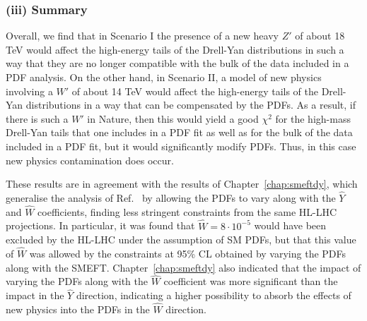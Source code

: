 \documentclass[withindex,glossary]{cam-thesis}
\begin{document}
\subsubsection*{(iii) Summary}
Overall, we find that in Scenario I the presence of a new
heavy $Z'$ of about 18 TeV would affect the high-energy tails of the Drell-Yan
  distributions in such a way that they are no longer compatible with the
  bulk of the data included in a PDF analysis.
    On the other hand, in Scenario II, a model of new physics involving a $W'$ of about
  14 TeV  would affect the high-energy tails of the Drell-Yan
  distributions in a way that can be compensated by the PDFs. As a result, if there
  is such a $W'$ in Nature, then this would yield a good $\chi^2$ for
  the high-mass Drell-Yan tails that one includes in a PDF fit as well
  as for the bulk of the data included in a PDF fit, but it 
  would significantly modify PDFs.  Thus, in this case new physics
  contamination does occur.


These results are in agreement with the results of Chapter~\ref{chap:smeftdy}, which generalise the analysis of
Ref.~\cite{Torre:2020aiz} by allowing the PDFs to vary along with the
$\hat{Y}$ and $\hat{W}$ coefficients, finding less stringent
constraints from the same HL-LHC projections.  In particular, it was found that $\hat{W}=8\cdot 10^{-5}$ would have been excluded by the HL-LHC under the assumption of SM PDFs, but that this value of $\hat{W}$ was allowed by the constraints at 95\% CL obtained by varying the PDFs along with the SMEFT.
Chapter~\ref{chap:smeftdy} also indicated that the impact of varying the PDFs along with the
$\hat{W}$ coefficient was more significant than the impact in the $\hat{Y}$ direction, indicating 
a higher possibility to absorb the effects of new physics into the PDFs in the $\hat{W}$ direction.
\end{document}
